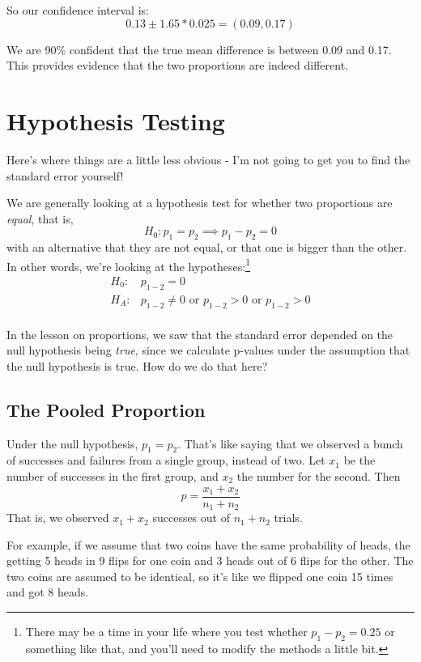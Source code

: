 \documentclass[
  letterpaper,
  DIV=11,
  numbers=noendperiod]{scrreprt}
\begin{document}
So our confidence interval is: \[
0.13 \pm 1.65*0.025 = (0.09, 0.17)
\]

We are 90\% confident that the true mean difference is between 0.09 and
0.17. This provides evidence that the two proportions are indeed
different.

\hypertarget{hypothesis-testing}{%
\section{Hypothesis Testing}\label{hypothesis-testing}}

Here's where things are a little less obvious - I'm not going to get you
to find the standard error yourself!

We are generally looking at a hypothesis test for whether two
proportions are \emph{equal}, that is, \[
H_0: p_1 = p_2\implies p_1 - p_2 = 0
\] with an alternative that they are not equal, or that one is bigger
than the other. In other words, we're looking at the
hypotheses:\footnote{There may be a time in your life where you test
  whether \(p_1 - p_2 = 0.25\) or something like that, and you'll need
  to modify the methods a little bit.} \begin{align*}
H_0: &p_{1-2} = 0\\
H_A: &p_{1-2} \ne 0\text{ or }p_{1-2} > 0\text{ or }p_{1-2} > 0\\
\end{align*}

In the lesson on proportions, we saw that the standard error depended on
the null hypothesis being \emph{true}, since we calculate p-values under
the assumption that the null hypothesis is true. How do we do that here?

\hypertarget{the-pooled-proportion}{%
\subsection{The Pooled Proportion}\label{the-pooled-proportion}}

Under the null hypothesis, \(p_1 = p_2\). That's like saying that we
observed a bunch of successes and failures from a single group, instead
of two. Let \(x_1\) be the number of successes in the first group, and
\(x_2\) the number for the second. Then \[
\hat p = \frac{x_1 + x_2}{n_1 + n_2}
\] That is, we observed \(x_1 + x_2\) successes out of \(n_1 + n_2\)
trials.

For example, if we assume that two coins have the same probability of
heads, the getting 5 heads in 9 flips for one coin and 3 heads out of 6
flips for the other. The two coins are assumed to be identical, so it's
like we flipped one coin 15 times and got 8 heads.
\end{document}
